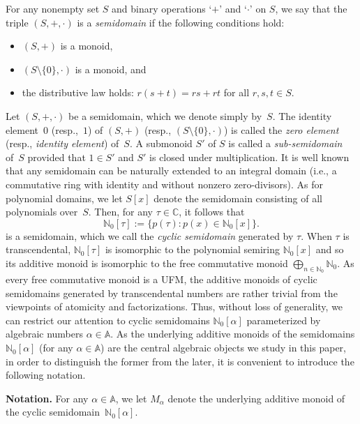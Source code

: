 \documentclass[11pt]{amsart}
\theoremstyle{definition}
\theoremstyle{remark}
\numberwithin{equation}{section}
\newcommand{\aaa}{\mathbb{A}}
\newcommand{\cc}{\mathbb{C}}
\newcommand{\nn}{\mathbb{N}}
\begin{document}
For any nonempty set $S$ and binary operations `$+$' and `$\cdot$' on $S$, we say that the triple $(S,+,\cdot)$ is a \emph{semidomain} if the following conditions hold:
\begin{itemize}
    \item $(S,+)$ is a monoid,
    \smallskip
    
    \item $(S \setminus \{0\}, \cdot)$ is a monoid, and
    \smallskip

    \item the distributive law holds: $r(s+t) = rs + rt$ for all $r,s,t \in S$.
\end{itemize}

Let $(S,+ ,\cdot)$ be a semidomain, which we denote simply by~$S$. The identity element~$0$ (resp.,~$1$) of $(S,+)$ (resp., $(S \setminus \{0\},\cdot)$) is called the \emph{zero element} (resp., \emph{identity element}) of~$S$. A submonoid $S'$ of $S$ is called a \emph{sub-semidomain} of~$S$ provided that $1 \in S'$ and $S'$ is closed under multiplication. It is well known that any semidomain can be naturally extended to an integral domain (i.e., a commutative ring with identity and without nonzero zero-divisors). %
As for polynomial domains, we let $S[x]$ denote the semidomain consisting of all polynomials over~$S$. Then, for any $\tau \in \cc$, it follows that
\[
    \nn_0[\tau] := \big\{ p(\tau) : p(x) \in \nn_0[x] \big\}.
\]
is a semidomain, which we call the \emph{cyclic semidomain} generated by $\tau$. When $\tau$ is transcendental, $\nn_0[\tau]$ is isomorphic to the polynomial semiring $\nn_0[x]$ and so its additive monoid is isomorphic to the free commutative monoid $\bigoplus_{n \in \nn_0} \nn_0$. As every free commutative monoid is a UFM, the additive monoids of cyclic semidomains generated by transcendental numbers are rather trivial from the viewpoints of atomicity and factorizations. Thus, without loss of generality, we can restrict our attention to cyclic semidomains $\nn_0[\alpha]$ parameterized by algebraic numbers $\alpha \in \mathbb{A}$. As the underlying additive monoids of the semidomains $\nn_0[\alpha]$ (for any $\alpha \in \aaa$) are the central algebraic objects we study in this paper, in order to distinguish the former from the later, it is convenient to introduce the following notation. 
\smallskip

\noindent \textbf{Notation.} For any $\alpha \in \aaa$, we let $M_\alpha$ denote the underlying additive monoid of the cyclic semidomain~$\nn_0[\alpha]$.
\smallskip
\end{document}
